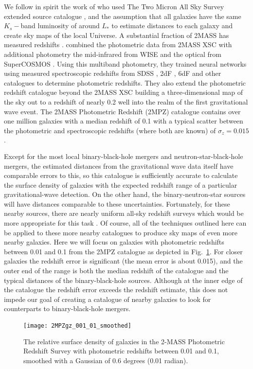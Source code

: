 \documentclass[useAMS,usenatbib]{mn2e}
\begin{document}
We follow in spirit the work of \citet{2004PASA...21..396J} who used
The Two Micron All Sky Survey extended source catalogue \citep[2MASS
  XSC,][]{2000AJ....119.2498J,2006AJ....131.1163S}, and the assumption
that all galaxies have the same $K_s-$band luminosity of around $L_*$
to estimate distances to each galaxy and create sky maps of the local
Universe.  A substantial fraction of 2MASS has measured redshifts
\citep[e.g][]{2012ApJS..199...26H}.  \citet{2014ApJS..210....9B}
combined the photometric data from 2MASS XSC with additional
photometry the mid-infrared from WISE \citep{2010AJ....140.1868W} and
the optical from SuperCOSMOS
\citep{2001MNRAS.326.1315H,2001MNRAS.326.1295H,2001MNRAS.326.1279H}.
Using this multiband photometry, they trained neural networks using
measured spectroscopic redshifts from SDSS
\citep{2012ApJS..203...21A,2014ApJS..211...17A}, 2dF
\citep{2001MNRAS.328.1039C,2003astro.ph..6581C}, 6dF
\citep{2004MNRAS.355..747J,2009MNRAS.399..683J} and other catalogues
to determine photometric redshifts.  They also extend the photometric
redshift catalogue beyond the 2MASS XSC building a three-dimensional
map of the sky out to a redshift of nearly 0.2 well into the realm of
the first gravitational wave event.  The 2MASS Photometric Redshift
(2MPZ) catalogue contains over one million galaxies with a median
redshift of 0.1 with a typical scatter between the
photometric and spectroscopic redshifts (where both are known) of
$\sigma_z = 0.015$.

Except for the most local binary-black-hole mergers and
neutron-star-black-hole mergers, the estimated distances from the
gravitational wave data itself have comparable errors to this, so this
catalogue is sufficiently accurate to calculate the surface density of
galaxies with the expected redshift range of a particular
gravitational-wave detection.  On the other hand, the
binary-neutron-star sources will have distances comparable to these
uncertainties.  Fortunately, for these nearby sources, there are
nearly uniform all-sky redshift surveys which would be more
appropriate for this task
\citep[e.g.][]{2000MNRAS.317...55S,2012ApJS..199...26H}.  Of course,
all of the techniques outlined here can be applied to these more
nearby catalogues to produce sky maps of even more nearby galaxies.
Here we will focus on galaxies with photometric redshifts between 0.01
and 0.1 from the 2MPZ catalogue as depicted in Fig.~\ref{fig:galmap}.
For closer galaxies the redshift error is significant (the mean error
is about 0.015), and the outer end of the range is both the median
redshift of the catalogue and the typical distances of the
binary-black-hole sources.  Although at the inner edge of the
catalogue the redshift error exceeds the redshift estimate, this does
not impede our goal of creating a catalogue of nearby galaxies to
look for counterparts to binary-black-hole mergers.
\begin{figure}
  \texttt{[image: 2MPZgz\_001\_01\_smoothed]}
  \caption{The relative surface density of galaxies in the 2-MASS Photometric Redshift Survey with photometric redshifts between 0.01 and 0.1, smoothed with a Gaussian of 0.6 degrees (0.01 radian).}
  \label{fig:galmap}
\end{figure}
\end{document}
